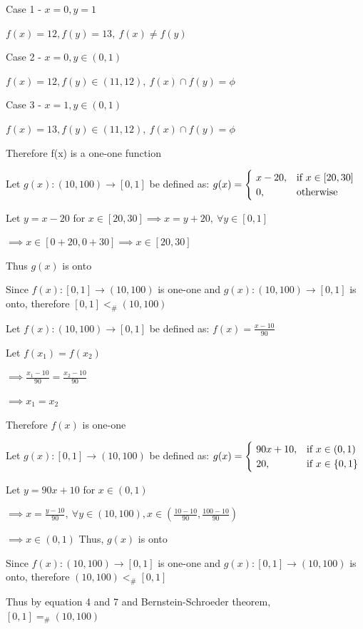 \documentclass{article}
\begin{document}
    \quad Case 1 - $x=0, y=1$
    
    \quad $f(x)=12, f(y)=13, ~ f(x) \neq f(y)$
    
    \quad Case 2 - $x=0, y \in (0, 1)$
    
    \quad $f(x)=12, f(y) \in (11, 12), ~f(x) \cap f(y) = \phi $
        
    \quad Case 3 - $x=1, y \in (0, 1)$
    
    \quad $f(x)=13, f(y) \in (11, 12), ~f(x) \cap f(y) = \phi$
        
    \quad Therefore f(x) is a one-one function 
    
    \quad Let $g(x): (10, 100) \to [0, 1]$  be defined as:
    $g(x) = 
         \begin{cases}
           ~x-20, & \hbox{if $x \in [20, 30]$}\\
           ~0, & \hbox{otherwise}\\
         \end{cases}$
    
    \quad Let $y=x-20$ for $x \in[20, 30] \implies x=y+20, ~\forall y \in [0, 1] $
    
    \quad $\implies x \in [0+20, 0+30] \implies x \in [20, 30]$
    
    \quad Thus $g(x)$ is onto 
    
    \quad Since $f(x): [0,1] \to (10, 100)$ is one-one and $g(x): (10, 100) \to [0, 1]$ is onto, therefore $[0, 1] <_{\#} (10, 100)$ 
    
    
    \quad Let $f(x): (10, 100) \to [0, 1]$  be defined as:
    $f(x) =  \frac{x-10}{90}$
    
    \quad Let $ f(x_{1})=f(x_{2}) $
    
    \quad $\implies \frac{x_{1}-10}{90}=\frac{x_{2}-10}{90} $ 
    
    \quad $\implies x_{1}=x_{2}$ 
    
    \quad Therefore $f(x)$ is one-one 
    
    \quad Let $g(x): [0,1] \to (10, 100)$  be defined as:
    $g(x) = 
         \begin{cases}
           ~90x+10, &\hbox{if $x \in (0, 1)$}\\
           ~20,  &\hbox{if $x \in \{0, 1\}$}\\ 
         \end{cases}$
        
    \quad Let $y=90x+10$ for $x \in (0,1)$
    
    \quad $\implies x=\frac{y-10}{90}, ~ \forall
     y \in (10, 100), x \in (\frac{10-10}{90}, \frac{100-10}{90}) $
     
    \quad $\implies x \in (0, 1) $
    \quad Thus, $g(x)$ is onto 
    
    \quad Since $f(x): (10, 100) \to [0, 1]$ is one-one and $g(x): [0,1] \to (10, 100)$ is onto, therefore $(10, 100) <_{\#} [0, 1]$ 
    
    
    \quad Thus by equation 4 and 7 and Bernstein-Schroeder theorem, $[0, 1] =_{\#} (10, 100) $
    
    
\end{document}
